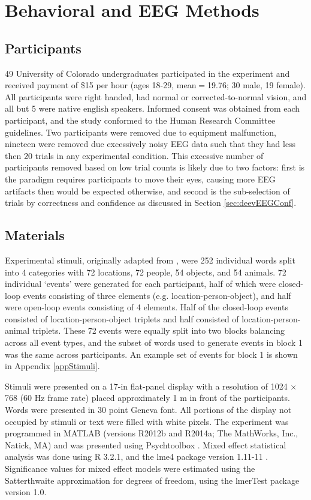 \documentclass[11pt, titlepage, twoside]{article}
\begin{document}
\section{Behavioral and EEG Methods}\label{sec:behmethods}


\subsection{Participants}
49 University of Colorado undergraduates participated in the experiment and received payment of \$15 per hour (ages 18-29, mean$=$19.76; 30 male, 19 female). All participants were right handed, had normal or corrected-to-normal vision, and all but 5 were native english speakers.  Informed consent was obtained from each participant, and the study conformed to the Human Research Committee guidelines.  Two participants were removed due to equipment malfunction, nineteen were removed due excessively noisy EEG data such that they had less then 20 trials in any experimental condition.  This excessive number of participants removed based on low trial counts is likely due to two factors: first is the paradigm requires participants to move their eyes, causing more EEG artifacts then would be expected otherwise, and second is the sub-selection of trials by correctness and confidence as discussed in Section \ref{sec:deevEEGConf}.  

\subsection{Materials}
Experimental stimuli, originally adapted from \textcite{HornerBisbyBushEtAl15}, were 252 individual words split into 4 categories with 72 locations, 72 people, 54 objects, and 54 animals.  72 individual `events' were generated for each participant, half of which were closed-loop events consisting of three elements (e.g. location-person-object), and half were open-loop events consisting of 4 elements.  Half of the closed-loop events consisted of location-person-object triplets and half consisted of location-person-animal triplets.  These 72 events were equally split into two blocks balancing across all event types, and the subset of words used to generate events in block 1 was the same across participants.  An example set of events for block 1 is shown in Appendix \ref{appStimuli}.  

Stimuli were presented on a 17-in flat-panel display with a resolution of 1024 $\times$ 768 (60 Hz frame rate) placed approximately 1 m in front of the participants. Words were presented in 30 point Geneva font.  All portions of the display not occupied by stimuli or text were filled with white pixels. The experiment was programmed in MATLAB (versions R2012b and R2014a; The MathWorks, Inc., Natick, MA) and was presented using Psychtoolbox \cite{Brainard97}.  Mixed effect statistical analysis was done using R 3.2.1, and the lme4 package version 1.11-11 \cite{BatesMachlerBolkerEtAl14}.  Significance values for mixed effect models were estimated using the Satterthwaite approximation for degrees of freedom, using the lmerTest package version 1.0.
\end{document}
